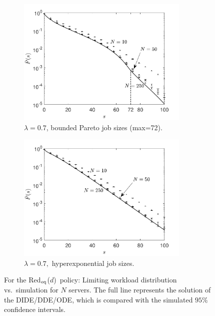 \documentclass[12pt]{report}
\newcommand{\Redid}{Red$_{\textup{eq}}$($d$)}
\begin{document}
\begin{figure}[t]
\begin{subfigure}{.45\textwidth}
\begin{center}
\includegraphics[width=0.9\textwidth]{figures/Chapter3/BoundedParetolb02ub72alpha11lam07d2.pdf}
\caption{$\lambda=0.7$, bounded Pareto job sizes (max=72).}
\label{fig:validatePAR}
\end{center}
\end{subfigure}
\begin{subfigure}{.45\textwidth}
\begin{center}
\includegraphics[width=0.9\textwidth]{figures/Chapter3/HEXPSCV9f05lam07d2.pdf}
\caption{$\lambda=0.7,$ hyperexponential job sizes.}
\label{fig:validateHEXP}
\end{center}
\end{subfigure}
\caption{For the \Redid\ policy: Limiting workload distribution vs.~simulation 
	for $N$ servers.
	The full line represents the solution of the DIDE/DDE/ODE, which is compared with the simulated $95\%$ confidence intervals.}\label{fig:accuracy}
\end{figure}
\end{document}
